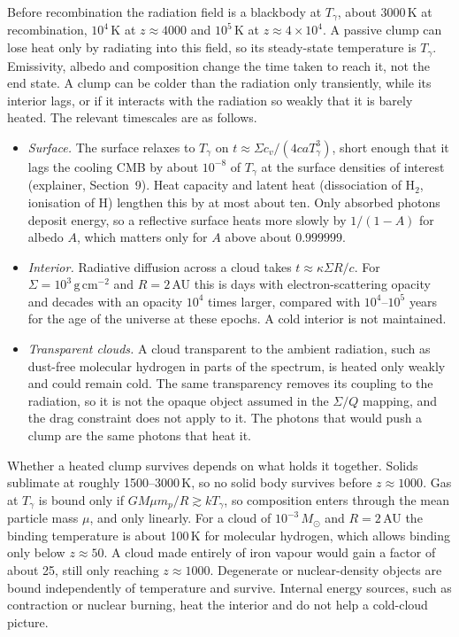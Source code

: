 \documentclass[11pt,a4paper]{article}
\begin{document}
Before recombination the radiation field is a blackbody at $T_\gamma$, about 3000\,K at recombination, $10^4$\,K at $z \approx 4000$ and $10^5$\,K at $z \approx 4\times10^4$. A passive clump can lose heat only by radiating into this field, so its steady-state temperature is $T_\gamma$. Emissivity, albedo and composition change the time taken to reach it, not the end state. A clump can be colder than the radiation only transiently, while its interior lags, or if it interacts with the radiation so weakly that it is barely heated. The relevant timescales are as follows.
\begin{itemize}
\item \emph{Surface.} The surface relaxes to $T_\gamma$ on $t \approx \Sigma c_v/(4caT_\gamma^3)$, short enough that it lags the cooling CMB by about $10^{-8}$ of $T_\gamma$ at the surface densities of interest (explainer, Section~9). Heat capacity and latent heat (dissociation of H$_2$, ionisation of H) lengthen this by at most about ten. Only absorbed photons deposit energy, so a reflective surface heats more slowly by $1/(1-A)$ for albedo $A$, which matters only for $A$ above about $0.999999$.
\item \emph{Interior.} Radiative diffusion across a cloud takes $t \approx \kappa \Sigma R/c$. For $\Sigma = 10^3\,\mathrm{g\,cm^{-2}}$ and $R = 2$\,AU this is days with electron-scattering opacity and decades with an opacity $10^4$ times larger, compared with $10^4$--$10^5$ years for the age of the universe at these epochs. A cold interior is not maintained.
\item \emph{Transparent clouds.} A cloud transparent to the ambient radiation, such as dust-free molecular hydrogen in parts of the spectrum, is heated only weakly and could remain cold. The same transparency removes its coupling to the radiation, so it is not the opaque object assumed in the $\Sigma/Q$ mapping, and the drag constraint does not apply to it. The photons that would push a clump are the same photons that heat it.
\end{itemize}

Whether a heated clump survives depends on what holds it together. Solids sublimate at roughly 1500--3000\,K, so no solid body survives before $z \approx 1000$. Gas at $T_\gamma$ is bound only if $GM\mu m_p/R \gtrsim kT_\gamma$, so composition enters through the mean particle mass $\mu$, and only linearly. For a cloud of $10^{-3}\,M_\odot$ and $R = 2$\,AU the binding temperature is about 100\,K for molecular hydrogen, which allows binding only below $z \approx 50$. A cloud made entirely of iron vapour would gain a factor of about 25, still only reaching $z \approx 1000$. Degenerate or nuclear-density objects are bound independently of temperature and survive. Internal energy sources, such as contraction or nuclear burning, heat the interior and do not help a cold-cloud picture.
\end{document}
